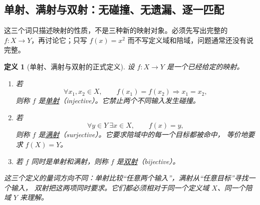 \documentclass[UTF8,fontset=none,a4paper,11pt]{ctexart}
\theoremstyle{foundation-definition}
\newtheorem{definition}{定义}[section]
\theoremstyle{foundation-theorem}
\theoremstyle{foundation-proposition}
\theoremstyle{foundation-example}
\theoremstyle{foundation-remark}
\theoremstyle{foundation-theorem}
\newcommand{\term}[2]{\hyperref[#1]{#2}}
\begin{document}
\subsection{单射、满射与双射：无碰撞、无遗漏、逐一匹配}

这三个词只描述映射的性质，不是三种新的映射对象。必须先写出完整的
\(f:X\to Y\)，再讨论它；只写 \(f(x)=x^2\) 而不写定义域和陪域，问题通常还没有说完整。

\begin{definition}[单射、满射与双射的正式定义]
设 \(f:X\to Y\) 是一个已经给定的映射。

\begin{enumerate}[label=(\arabic*)]
  \item \label{def:injective}若
  \[
    \forall x_1,x_2\in X,\qquad
    f(x_1)=f(x_2)\Longrightarrow x_1=x_2,
  \]
  则称 \(f\) 是\term{def:injective}{单射}（injective）。它禁止两个不同输入发生碰撞。

  \item \label{def:surjective}若
  \[
    \forall y\in Y\ \exists x\in X,\qquad f(x)=y,
  \]
  则称 \(f\) 是\term{def:surjective}{满射}（surjective）。它要求陪域中的每一个目标都被命中，
  等价地要求 \(f(X)=Y\)。

  \item \label{def:bijective}若 \(f\) 同时是单射和满射，则称 \(f\) 是\term{def:bijective}{双射}（bijective）。
\end{enumerate}

这三个定义的量词方向不同：单射比较“任意两个输入”，满射从“任意目标”寻找一个输入，
双射把这两项同时要求。它们都必须相对于同一个定义域 \(X\)、同一个陪域 \(Y\) 来理解。
\end{definition}
\end{document}

